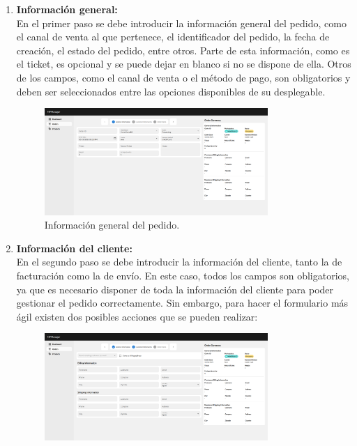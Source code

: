 \begin{enumerate}
    \item \textbf{Información general:} \\
          En el primer paso se debe introducir la información general del pedido, como el canal de venta al que pertenece, el identificador del pedido, la fecha de creación, el estado del pedido, entre otros. Parte de esta información, como es el ticket, es opcional y se puede dejar en blanco si no se dispone de ella. Otros de los campos, como el canal de venta o el método de pago, son obligatorios y deben ser seleccionados entre las opciones disponibles de su desplegable.
          \begin{figure}[H]
              \centering
              \includegraphics[width=0.8\textwidth]{figures/design_develop/screenshots/creacion_pedido_1.png}
              \caption{Información general del pedido.}
              \label{fig:dev:ss:creacion_pedido_1}
          \end{figure}
    \item \textbf{Información del cliente:} \\
          En el segundo paso se debe introducir la información del cliente, tanto la de facturación como la de envío. En este caso, todos los campos son obligatorios, ya que es necesario disponer de toda la información del cliente para poder gestionar el pedido correctamente. Sin embargo, para hacer el formulario más ágil existen dos posibles acciones que se pueden realizar:
          \begin{figure}[H]
              \centering
              \includegraphics[width=0.8\textwidth]{figures/design_develop/screenshots/creacion_pedido_2.png}

\end{figure}
\end{enumerate}

